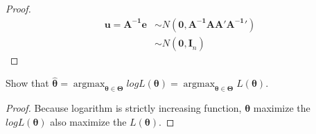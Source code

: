 \documentclass[12pt]{article}
\newenvironment{question}[2][Question]{\begin{trivlist}
\item[\hskip \labelsep {\bfseries #1}\hskip \labelsep {\bfseries #2.}]}{\end{trivlist}}
\begin{document}
\begin{proof}
\begin{align*}
\bm{u=A^{-1}e}&\sim N(\bm{0},\bm{A^{-1}AA'A^{-1}'})\\
&\sim N(\bm{0,I}_n)
\end{align*}
\end{proof}

\begin{question}{5.15}
Show that $\hat{\bm{\theta}}= \operatorname*{argmax}_{\bm{\theta \in \Theta}}logL(\bm{\theta}) = \operatorname*{argmax}_{\bm{\theta \in \Theta}}L(\bm{\theta})$.
\end{question}

\begin{proof}
Because logarithm is strictly increasing function, $\bm{\theta}$ maximize the $logL(\bm{\theta})$ also maximize the $L(\bm{\theta})$.
\end{proof}
\end{document}

